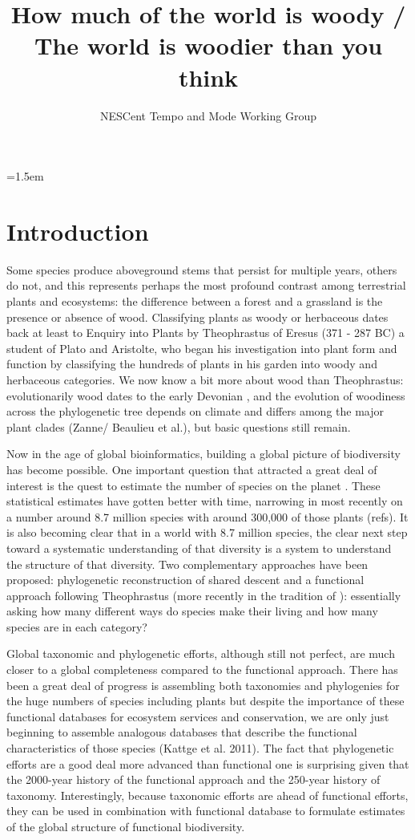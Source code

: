 \documentclass[12pt]{article}
\title{How much of the world is woody / The world is woodier than you
  think}
\author{NESCent Tempo and Mode Working Group}
\date{}
\affiliation{\noindent
Fill this in here\ldots}
\begin{document}
\mstitlepage
\parindent=1.5em
\addtolength{\parskip}{.3em}

\section{Introduction}

Some species produce aboveground stems that persist for multiple years, others do not, and this represents perhaps the most profound contrast among terrestrial plants and ecosystems: the difference between a forest and a grassland is the presence or absence of wood. Classifying plants as woody or herbaceous dates back at least to Enquiry into Plants by Theophrastus of Eresus (371 - 287 BC) a student of Plato and Aristolte, who began his investigation into plant form and function by classifying the hundreds of plants in his garden into woody and herbaceous categories.  We now know a bit more about wood than Theophrastus: evolutionarily wood dates to the early Devonian \citep[~400 mya;][]{gerrienne2011simple}, and the evolution of woodiness across the phylogenetic tree depends on climate and differs among the major plant clades (Zanne/ Beaulieu et al.), but basic questions still remain.

Now in the age of global bioinformatics, building a global picture of biodiversity has become possible.  One important question that attracted a great deal of interest is the quest to estimate the number of species on the planet \citep{may1988many,erwin1991many, stork1993many, mora2011plos}.  These statistical estimates have gotten better with time, narrowing in most recently on a number around 8.7 million species with around 300,000 of those plants (refs).  It is also becoming clear that in a world with 8.7 million species, the clear next step toward a systematic understanding of that diversity is a system to understand the structure of that diversity.  Two complementary approaches have been proposed: phylogenetic reconstruction of shared descent \citep{smith2011understanding} and a functional approach following Theophrastus (more recently in the tradition of \citep{grime1979plant, weiher2009challenging, westoby2002plant}): essentially asking how many different ways do species make their living and how many species are in each category?

Global taxonomic and phylogenetic efforts, although still not perfect, are much closer to a global completeness compared to the functional approach.   There has been a great deal of progress is assembling both taxonomies and phylogenies for the huge numbers of species including plants \citep{smith2011understanding} but despite the importance of these functional databases for ecosystem services and conservation, we are only just beginning to assemble analogous databases that describe the functional characteristics of those species (Kattge et al. 2011).   The fact that phylogenetic efforts are a good deal more advanced than functional one is surprising given that the 2000-year history of the functional approach and the 250-year history of taxonomy.  Interestingly, because taxonomic efforts are ahead of functional efforts, they can be used in combination with functional database to formulate estimates of the global structure of functional biodiversity.
\end{document}
